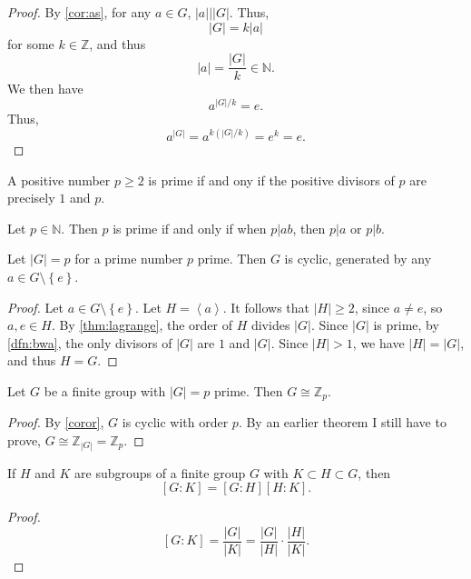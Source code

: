 \begin{proof}
	By \ref{cor:as}, for any $a\in G$, $\left| a \right| |\left| G \right| $. Thus,
	\[
		\left| G \right| =k\left| a \right| 
	\]
	for some $k\in\mathbb{Z}$, and thus
	\[
		\left| a \right| =\frac{\left| G \right| }{k}\in\mathbb{N}
	.\]
	We then have
	\[
		a^{\left| G \right| /k}=e
	.\]
	Thus,
	\[
		a^{\left| G \right| }=a^{k (\left| G \right| /k)}=e^k=e	
	.\]
\end{proof}
\begin{definition}\label{dfn:bwa}
	A positive number $p\geq 2$ is prime if and ony if the positive divisors of $p$ are precisely $1$ and $p$.
\end{definition}
\begin{proposition}
	Let $p\in\mathbb{N}$. Then $p$ is prime if and only if when $p|ab$, then $p|a$ or $p|b$.
\end{proposition}
\begin{corollary}\label{coror}
	Let $\left| G \right| =p$ for a prime number $p$ prime. Then $G$ is cyclic, generated by any $a\in G\setminus\left\{ e \right\} $.
\end{corollary}
\begin{proof}
	Let $a\in G\setminus\left\{ e \right\} $. Let $H=\left<a \right>$. It follows that $\left| H \right| \geq 2$, since $a\neq e$, so $a,e\in H$. By \ref{thm:lagrange}, the order of $H$ divides $\left| G \right| $. Since $\left| G \right| $ is prime, by \ref{dfn:bwa}, the only divisors of $\left| G \right| $ are $1$ and $\left| G \right|$. Since $\left| H \right| >1$, we have $\left| H \right| =\left| G \right| $, and thus $H=G$.
\end{proof}
\begin{corollary}
	Let $G$ be a finite group with $\left| G \right| =p$ prime. Then $G\cong \mathbb{Z}_p$.
\end{corollary}
\begin{proof}
	By \ref{coror}, $G$ is cyclic with order $p$. By an earlier theorem I still have to prove, $G\cong \mathbb{Z}_{\left| G \right| }=\mathbb{Z}_p$.
\end{proof}
\begin{corollary}
	If $H$ and $K$ are subgroups of a finite group $G$ with $K\subset H\subset G$, then
	\[
		[G:K]=[G:H][H:K]
	.\]
\end{corollary}
\begin{proof}
	\[
		[G:K]=\frac{\left| G \right| }{\left| K \right| }=\frac{\left| G \right| }{\left| H \right| }\cdot \frac{\left| H \right| }{\left| K \right| }
	.\]
\end{proof}
